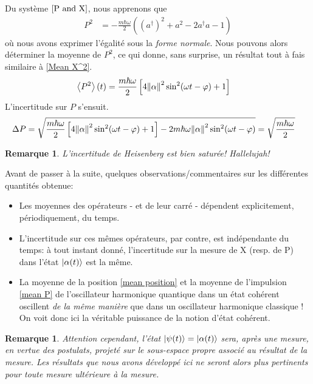 \documentclass[11pt,oneside,a4paper]{article}
\newcommand{\h}{\ensuremath{\hbar}}
\newtheorem{remark}[theorem]{Remarque}
\begin{document}
Du système $\eqref{P and X}$, nous apprenons que 
\begin{align}
  P^2 &= -\frac{m\h\omega}{2}\left(\left(a^\dagger\right)^2+a^2-2a^\dagger a-1\right)
\end{align}
où nous avons exprimer l'égalité sous la \emph{forme normale}. Nous pouvons alors déterminer la moyenne de $P^2$, ce qui donne, sans surprise, un résultat tout à fais similaire à \eqref{Mean X^2}.
\begin{align}
  \label{Mean P^2}
  \expval{P^2}(t)&= \frac{m\h\omega}{2}\left[4\norm{\alpha}^2\sin^2(\omega t-\varphi)+1\right]
\end{align}
L'incertitude sur $P$ s'ensuit.
\begin{align}
  \Delta P &= \sqrt{\frac{m\h\omega}{2}\left[4\norm{\alpha}^2\sin^2(\omega t-\varphi)+1\right] - 2m\h\omega\norm{\alpha}^2\sin^2(\omega t-\varphi)} = \sqrt{\frac{m\h\omega}{2}}
\end{align}

\begin{remark}
  L'incertitude de Heisenberg est bien saturée! Hallelujah!
\end{remark}

Avant de passer à la suite, quelques observations/commentaires sur les différentes quantités obtenue:
\begin{itemize}
  \item Les moyennes des opérateurs - et de leur carré - dépendent explicitement, périodiquement, du temps.
  \item L'incertitude sur ces mêmes opérateurs, par contre, est indépendante du temps: à tout instant donné, l'incertitude sur la mesure de X (resp. de P) dans l'état $\ket{\alpha(t)}$ est la même.
  \item La moyenne de la position \eqref{mean position} et la moyenne de l'impulsion \eqref{mean P} de l'oscillateur harmonique quantique dans un état cohérent oscillent \emph{de la même manière} que dans un oscillateur harmonique classique ! On voit donc ici la véritable puissance de la notion d'état cohérent.
\end{itemize} 

\begin{remark}
  Attention cependant, l'état $\ket{\psi(t)} = \ket{\alpha(t)}$ sera, après une mesure, en vertue des postulats, projeté sur le sous-espace propre associé au résultat de la mesure. Les résultats que nous avons développé ici ne seront alors plus pertinents pour toute mesure ultérieure à la mesure.
\end{remark}
\end{document}
